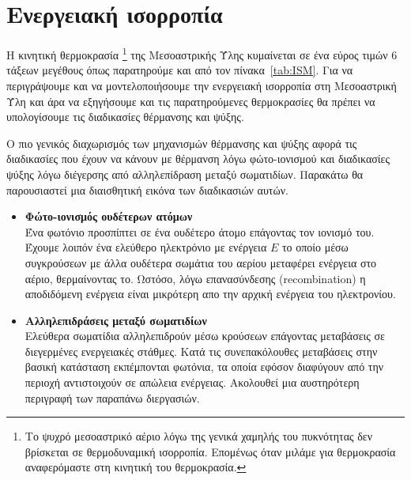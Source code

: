 \section{Ενεργειακή ισορροπία}
\label{par:EnergyBalance}
Η κινητική θερμοκρασία \footnote{Το ψυχρό μεσοαστρικό αέριο λόγω της γενικά χαμηλής του πυκνότητας δεν βρίσκεται σε θερμοδυναμική ισορροπία. Επομένως όταν μιλάμε για θερμοκρασία αναφερόμαστε στη κινητική του θερμοκρασία.\cite[p. 28]{spitzer_1998}} της Μεσοαστρικής Ύλης κυμαίνεται σε ένα εύρος τιμών 6 τάξεων μεγέθους όπως παρατηρούμε και από τον πίνακα~\ref{tab:ISM}. Για να περιγράψουμε και να μοντελοποιήσουμε την ενεργειακή ισορροπία στη Μεσοαστρική Ύλη και άρα να εξηγήσουμε και τις παρατηρούμενες θερμοκρασίες θα πρέπει να υπολογίσουμε τις διαδικασίες θέρμανσης και ψύξης. 
%

Ο πιο γενικός διαχωρισμός των μηχανισμών θέρμανσης και ψύξης αφορά τις διαδικασίες που έχουν να κάνουν με θέρμανση λόγω φώτο-ιονισμού και διαδικασίες ψύξης λόγω διέγερσης από αλληλεπίδραση μεταξύ σωματιδίων. Παρακάτω θα παρουσιαστεί μια διαισθητική εικόνα των διαδικασιών αυτών.
\begin{itemize}
	\item \textbf{Φώτο-ιονισμός ουδέτερων ατόμων} \\
	Ένα φωτόνιο προσπίπτει σε ένα ουδέτερο άτομο επάγοντας τον ιονισμό του. Έχουμε λοιπόν ένα ελεύθερο ηλεκτρόνιο με ενέργεια $E$ το οποίο μέσω συγκρούσεων με άλλα ουδέτερα σωμάτια του αερίου μεταφέρει ενέργεια στο αέριο, θερμαίνοντας το. Ωστόσο, λόγω επανασύνδεσης (recombination) η αποδιδόμενη ενέργεια είναι μικρότερη απο την αρχική ενέργεια του ηλεκτρονίου.
	\item \textbf{Αλληλεπιδράσεις μεταξύ σωματιδίων} \\ Ελεύθερα σωματίδια αλληλεπιδρούν μέσω κρούσεων επάγοντας μεταβάσεις σε διεγερμένες ενεργειακές στάθμες. Κατά τις συνεπακόλουθες μεταβάσεις στην βασική κατάσταση εκπέμπονται φωτόνια, τα οποία εφόσον διαφύγουν από την περιοχή αντιστοιχούν σε απώλεια ενέργειας.
	Ακολουθεί μια αυστηρότερη περιγραφή των παραπάνω διεργασιών.
\end{itemize}
